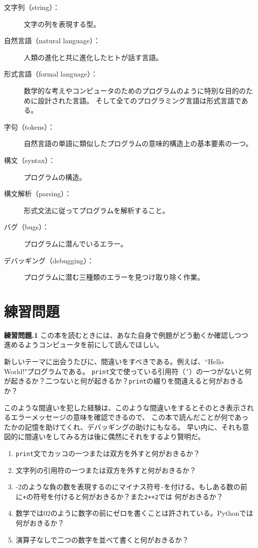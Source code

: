 \documentclass[a4j,12pt,makeidx]{jbook}
\newcommand{\tp}{\thechapter}
\begin{document}
\begin{description}
\item[文字列（string）：]文字の列を表現する型。

\item[自然言語（natural language）：]人類の進化と共に進化したヒトが話す言語。

\item[形式言語（formal language）：]数学的な考えやコンピュータのためのプログラムのように特別な目的のために設計された言語。
そして全てのプログラミング言語は形式言語である。

\item[字句（tokens）：]自然言語の単語に類似したプログラムの意味的構造上の基本要素の一つ。

\item[構文（syntax）：]プログラムの構造。

\item[構文解析（parsing）：]形式文法に従ってプログラムを解析すること。  

\item[バグ（bugs）：] プログラムに潜んでいるエラー。

\item[デバッギング（debugging）：]プログラムに潜む三種類のエラーを見つけ取り除く作業。 

\end{description}
%
\section{練習問題}
\noindent
{\bf 練習問題\tp.1} この本を読むときには、あなた自身で例題がどう動くか確認しつつ進めるようコンピュータを前にして読んでほしい。\par
新しいテーマに出会うたびに、間違いをすべきである。例えば、``Hello World!"プログラムである。
{\tt print}文で使っている引用符（{\tt '}）の一つがないと何が起きるか？二つないと何が起きるか？{\tt print}の綴りを間違えると何がおきるか？\par
このような間違いを犯した経験は、このような間違いをするとそのとき表示されるエラーメッセージの意味を確認できるので、
この本で読んだことが何であったかの記憶を助けてくれ、デバッギングの助けにもなる。
早い内に、それも意図的に間違いをしてみる方は後に偶然にそれをするより賢明だ。\par
\begin{enumerate}
\item {\tt print}文でカッコの一つまたは双方を外すと何がおきるか？
\item 文字列の引用符の一つまたは双方を外すと何がおきるか？
\item -2のような負の数を表現するのにマイナス符号{\tt -}を付ける。もしある数の前に{\tt +}の符号を付けると何がおきるか？また{\tt 2++2}では
何がおきるか？
\item 数学では02のように数字の前にゼロを書くことは許されている。Pythonでは何がおきるか？
\item 演算子なしで二つの数字を並べて書くと何がおきるか？
\end{enumerate}
\end{document}
